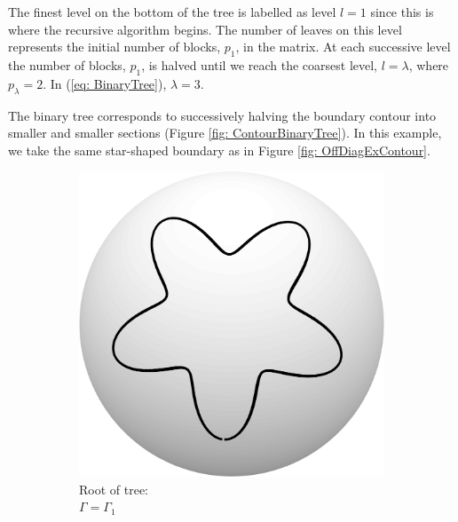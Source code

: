 \documentclass{sfuthesis}
\begin{document}
The finest level on the bottom of the tree is labelled as level $l=1$ since this is where the recursive algorithm begins. The number of leaves on this level represents the initial number of blocks, $p_1$, in the matrix. At each successive level the number of blocks, $p_1$, is halved until we reach the coarsest level, $l=\lambda$, where $p_\lambda=2$. In (\ref{eq: BinaryTree}), $\lambda=3$.

The binary tree corresponds to successively halving the boundary contour into smaller and smaller sections (Figure \ref{fig: ContourBinaryTree}). In this example, we take the same star-shaped boundary as in Figure \ref{fig: OffDiagExContour}. 

\begin{figure}
        \centering
        \begin{subfigure}[b]{0.23\textwidth}
         \captionsetup{justification=centering}
                \includegraphics[width=\textwidth]{ContourRoot}
                \caption{Root of tree: \\$\Gamma=\Gamma_1$}
               \label{fig: ContourRoot}
        \end{subfigure}%
        ~ 
         \begin{subfigure}[b]{0.23\textwidth}
         \captionsetup{justification=centering}

\end{subfigure}
\end{figure}
\end{document}
